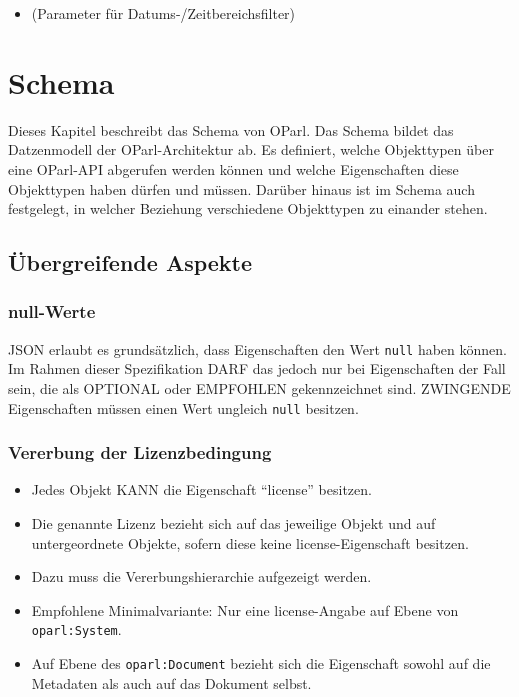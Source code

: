 \documentclass[,a4paper]{article}
\begin{document}
\begin{itemize}
\item
  (Parameter für Datums-/Zeitbereichsfilter)
\end{itemize}

\section{Schema}

Dieses Kapitel beschreibt das Schema von OParl. Das Schema bildet das
Datzenmodell der OParl-Architektur ab. Es definiert, welche Objekttypen
über eine OParl-API abgerufen werden können und welche Eigenschaften
diese Objekttypen haben dürfen und müssen. Darüber hinaus ist im Schema
auch festgelegt, in welcher Beziehung verschiedene Objekttypen zu
einander stehen.

\subsection{Übergreifende Aspekte}

\subsubsection{null-Werte}

JSON erlaubt es grundsätzlich, dass Eigenschaften den Wert \texttt{null}
haben können. Im Rahmen dieser Spezifikation DARF das jedoch nur bei
Eigenschaften der Fall sein, die als OPTIONAL oder EMPFOHLEN
gekennzeichnet sind. ZWINGENDE Eigenschaften müssen einen Wert ungleich
\texttt{null} besitzen.

\subsubsection{Vererbung der Lizenzbedingung}

\begin{itemize}
\item
  Jedes Objekt KANN die Eigenschaft ``license'' besitzen.
\item
  Die genannte Lizenz bezieht sich auf das jeweilige Objekt und auf
  untergeordnete Objekte, sofern diese keine license-Eigenschaft
  besitzen.
\item
  Dazu muss die Vererbungshierarchie aufgezeigt werden.
\item
  Empfohlene Minimalvariante: Nur eine license-Angabe auf Ebene von
  \texttt{oparl:System}.
\item
  Auf Ebene des \texttt{oparl:Document} bezieht sich die Eigenschaft
  sowohl auf die Metadaten als auch auf das Dokument selbst.
\end{itemize}
\end{document}

